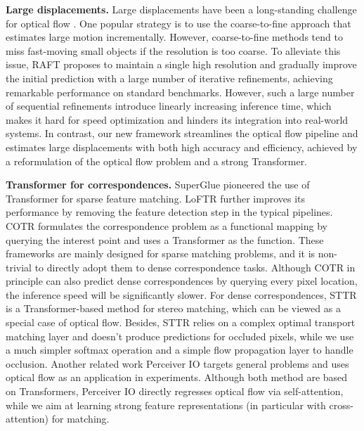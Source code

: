 \documentclass[10pt,twocolumn,letterpaper]{article}
\begin{document}
{\bf Large displacements.} Large displacements have been a long-standing challenge for optical flow \cite{brox2009large,weinzaepfel2013deepflow,brox2004high,chen2013large,bailer2015flow}.
One popular strategy is to use the coarse-to-fine approach \cite{hu2016efficient,brox2004high,sun2018pwc} that estimates large motion incrementally. However, coarse-to-fine methods tend to miss fast-moving small objects \cite{revaud2015epicflow} if the resolution is too coarse. To alleviate this issue, RAFT \cite{teed2020raft} proposes to maintain a single high resolution and gradually improve the initial prediction with a large number of iterative refinements, achieving remarkable performance on standard benchmarks. However, such a large number of sequential refinements introduce linearly increasing inference time, which makes it hard for speed optimization and hinders its integration into real-world systems. In contrast, our new framework streamlines the optical flow pipeline and estimates large displacements with both high accuracy and efficiency, achieved by a reformulation of the optical flow problem and a strong Transformer.



{\bf Transformer for correspondences.} SuperGlue \cite{sarlin2020superglue} pioneered the use of Transformer for sparse feature matching. LoFTR \cite{sun2021loftr} further improves its performance by removing the feature detection step in the typical pipelines. COTR \cite{jiang2021cotr} formulates the correspondence problem as a functional mapping by querying the interest point and uses a Transformer as the function. These frameworks are mainly designed for sparse matching problems, and it is non-trivial to directly adopt them to dense correspondence tasks. Although COTR in principle can also predict dense correspondences by querying every pixel location, the inference speed will be significantly slower. For dense correspondences, STTR \cite{li2021revisiting} is a Transformer-based method for stereo matching, which can be viewed as a special case of optical flow. Besides, STTR relies on a complex optimal transport matching layer and doesn't produce predictions for occluded pixels, while we use a much simpler softmax operation and a simple flow propagation layer to handle occlusion. Another related work Perceiver IO \cite{jaegle2021perceiver} targets general problems and uses optical flow as an application in experiments. Although both method are based on Transformers, Perceiver IO directly regresses optical flow via self-attention, while we aim at learning strong feature representations (in particular with cross-attention) for matching.
\end{document}

